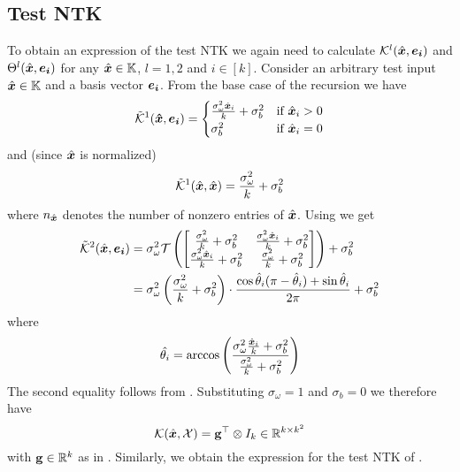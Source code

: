 \subsection{Test NTK}
To obtain an expression of the test NTK we again need to calculate $\mathcal{K}^{l}(\hat{\boldsymbol{x}}, \boldsymbol{e_i})$ and $\Theta^{l}(\hat{\boldsymbol{x}}, \boldsymbol{e_i})$ for any $\hat{\boldsymbol{x}} \in \mathbb{K}$,  $l = 1,2$ and $i \in [k]$. Consider an arbitrary test input  $\hat{\boldsymbol{x}} \in \mathbb{K}$ and a basis vector $\boldsymbol{e_i}$. From the base case of the recursion we have 
\begin{equation}
    \tilde{\mathcal{K}}^1(\boldsymbol{\hat{x}}, \boldsymbol{e_i}) =\begin{cases}
        \frac{\sigma_\omega^2 \hat{\boldsymbol{x}}_i}{k} + \sigma_b^2 & \text{if } \hat{\boldsymbol{x}}_i > 0 \\
        \sigma_b^2 & \text{if } \hat{\boldsymbol{x}}_i=0
    \end{cases}
\end{equation}
and (since $\hat{\boldsymbol{x}}$ is normalized)
\begin{equation}
    \tilde{\mathcal{K}}^1(\hat{\boldsymbol{x}}, \hat{\boldsymbol{x}}) = \frac{\sigma_\omega^2}{k} + \sigma_b^2
\end{equation}
where $n_{\hat{\boldsymbol{x}}}$ denotes the number of nonzero entries of $\hat{\boldsymbol{x}}$.
Using  we get
\begin{align}
    \tilde{\mathcal{K}}^2(\hat{\boldsymbol{x}},\boldsymbol{e_i}) &= \sigma_\omega^2 \mathcal{T}\left(\begin{bmatrix}
\frac{\sigma_\omega^2}{k}+\sigma_b^2 & \frac{\sigma_\omega^2\hat{\boldsymbol{x}}_i}{k}+\sigma_b^2 \\
\frac{\sigma_\omega^2 \hat{\boldsymbol{x}}_i}{k}+\sigma_b^2 & \frac{\sigma_\omega^2}{k}+\sigma_b^2 
\end{bmatrix}\right)+\sigma_b^2 \nonumber \\ &=
\sigma_\omega^2 \left(\frac{\sigma_\omega^2}{k} + \sigma_b^2\right) \cdot \frac{\cos \hat{\theta}_i (\pi - \hat{\theta}_i) + \sin \hat{\theta}_i}{2\pi} + \sigma_b^2
\end{align}
where 
\begin{equation}
 \hat{\theta_i} = \arccos\left(\frac{\sigma_\omega^2\frac{\hat{\boldsymbol{x}}_i}{k}+\sigma_b^2}{\frac{\sigma_\omega^2}{k}+\sigma_b^2}\right)
\end{equation}
The second equality follows from . Substituting $\sigma_\omega = 1$ and $\sigma_b=0$ we therefore have 
\begin{equation}
    \mathcal{K}(\hat{\boldsymbol{x}}, \mathcal{X}) = \mathbf{g}^\top \otimes I_k \in \mathbb{R}^{k \times k^2}
\end{equation}
with $\mathbf{g} \in \mathbb{R}^k$ as in . Similarly, we obtain the expression for the test NTK of .

